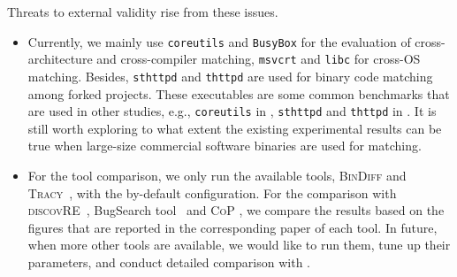  Threats to external validity rise from these issues.
\begin{itemize}[itemsep=0.15mm]
\item  Currently, we mainly use \texttt{coreutils} and  \texttt{BusyBox}  for the evaluation of cross-architecture and cross-compiler matching,  \texttt{msvcrt} and \texttt{libc} for cross-OS matching. Besides,  \texttt{sthttpd} and \texttt{thttpd} are used for binary code matching among forked projects. These executables  are some common benchmarks that are used in other studies, e.g., \texttt{coreutils} in \cite{DBLP:conf/sp/PewnyGGRH15,egele2014blanket}, \texttt{sthttpd} and \texttt{thttpd} in \cite{luo2014semantics,cop-tse}. It is still worth exploring to what extent the existing experimental results can be true when large-size commercial software binaries are used for matching.
\item For the tool comparison, we only run the available tools, \textsc{\small BinDiff} \cite{DBLP:conf/dimva/Flake04} and \textsc{Tracy}~\cite{DBLP:conf/pldi/DavidY14}, with the by-default configuration. For the comparison with \textsc{discovRE}~\cite{sebastian2016discovre}, BugSearch tool~\cite{DBLP:conf/sp/PewnyGGRH15} and  \textsc{CoP} \cite{luo2014semantics,cop-tse}, we compare the results based on the figures that are reported in the corresponding paper of each tool. In future, when more other tools are available, we would like to run them, tune up their parameters, and conduct detailed comparison with \toolNew.
 \end{itemize}

